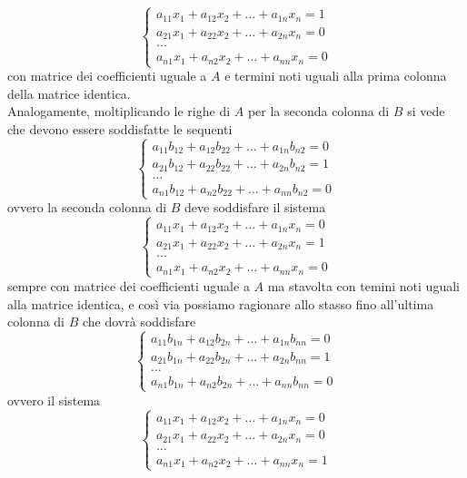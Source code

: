 \documentclass{book}
\begin{document}
\begin{equation}
   \begin{cases}
    a_{11}x_1 + a_{12}x_2+\dots +a_{1n}x_n =1\\
    a_{21}x_1 + a_{22}x_2+\dots +a_{2n}x_n =0\\
    \dots\\
    a_{n1}x_1 + a_{n2}x_2+\dots +a_{nn}x_n =0
  \end{cases}
\end{equation}
con matrice dei coefficienti uguale a $A$ e termini noti uguali alla prima colonna della matrice identica.\\
Analogamente, moltiplicando le righe di $A$ per la seconda colonna di $B$ si vede che devono essere soddisfatte
le sequenti
\begin{equation*}
  \begin{cases}
    a_{11}b_{12} + a_{12}b_{22}+\dots +a_{1n}b_{n2} =0\\
    a_{21}b_{12} + a_{22}b_{22}+\dots +a_{2n}b_{n2} =1\\
    \dots\\
    a_{n1}b_{12} + a_{n2}b_{22}+\dots +a_{nn}b_{n2} =0
  \end{cases}
\end{equation*}
ovvero la seconda colonna di $B$ deve soddisfare il sistema
\begin{equation}
   \begin{cases}
    a_{11}x_1 + a_{12}x_2+\dots +a_{1n}x_n =0\\
    a_{21}x_1 + a_{22}x_2+\dots +a_{2n}x_n =1\\
    \dots\\
    a_{n1}x_1 + a_{n2}x_2+\dots +a_{nn}x_n =0
  \end{cases}
\end{equation}
sempre con matrice dei coefficienti uguale a $A$ ma stavolta con temini noti uguali alla matrice identica, e
così via possiamo ragionare allo stasso fino all'ultima colonna di $B$ che dovrà soddisfare
\begin{equation*}
  \begin{cases}
    a_{11}b_{1n} + a_{12}b_{2n}+\dots +a_{1n}b_{nn} =0\\
    a_{21}b_{1n} + a_{22}b_{2n}+\dots +a_{2n}b_{nn} =1\\
    \dots\\
    a_{n1}b_{1n} + a_{n2}b_{2n}+\dots +a_{nn}b_{nn} =0
  \end{cases}
\end{equation*}
ovvero il sistema
\begin{equation}
   \begin{cases}
    a_{11}x_1 + a_{12}x_2+\dots +a_{1n}x_n =0\\
    a_{21}x_1 + a_{22}x_2+\dots +a_{2n}x_n =0\\
    \dots\\
    a_{n1}x_1 + a_{n2}x_2+\dots +a_{nn}x_n =1
  \end{cases}
\end{equation}
\end{document}
